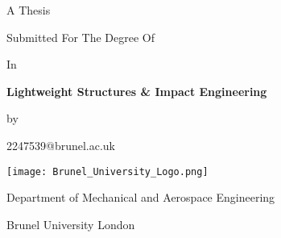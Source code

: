 
\begin{titlepage}
    \centering
     {\huge \textbf{\thesistitle} \par}
      \vspace{1.5cm}
     {\large \sc A Thesis \par}
      \vspace{0.1cm}
     {\large \sc Submitted For The Degree Of\par}
     \vspace{0.1cm}
      {\large {}\par} 
     \vspace{0.1cm}
     {\large \sc In \par}
     \vspace{0.1cm}
     {\large \sc \textbf{Lightweight Structures \& Impact Engineering}\par}
     
     \vspace{0.1cm}
     {\large by\par}
     \vspace{0.1cm}
     {\large \textbf{\thesisauthor}\par}
     \vspace{0.1cm}
     {\large 2247539@brunel.ac.uk\par}
     \vspace{0.1cm}
    \texttt{[image: Brunel\_University\_Logo.png]}\par
    \vspace{0.5cm}
    {\large \sc Department of Mechanical and Aerospace Engineering\par}

     {\large \sc Brunel University London\par}

    \vspace{0.5cm}
    {\large \sc \thesisdate\par}
    \vspace{2cm}
   
\end{titlepage}


\tableofcontents
\thispagestyle{empty}

\newpage
\listoffigures
\thispagestyle{empty}

\newpage
\listoftables
\thispagestyle{empty}

\newpage


\clearpage